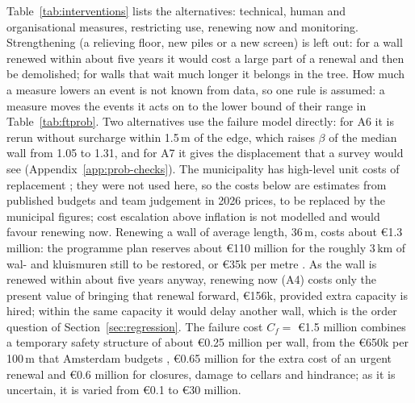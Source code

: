 Table~\ref{tab:interventions} lists the alternatives: technical, human and
organisational measures, restricting use, renewing now and monitoring.
Strengthening (a relieving floor, new piles or a new screen) is left out: for a
wall renewed within about five years it would cost a large part of a renewal and
then be demolished; for walls that wait much longer it belongs in the tree.
How much a measure lowers an event is not known
from data, so one rule is assumed: a measure moves the events it acts on to the
lower bound of their range in Table~\ref{tab:ftprob}. Two alternatives use the
failure model directly: for A6 it is rerun without surcharge within 1.5\,m of
the edge, which raises $\beta$ of the median wall from 1.05 to 1.31, and for A7
it gives the displacement that a survey would see
(Appendix~\ref{app:prob-checks}). The municipality has high-level unit costs
of replacement \parencite{utrecht_qa2026}; they were not used here, so the
costs below are estimates from published budgets and team judgement in 2026
prices, to be replaced by the municipal figures; cost escalation above
inflation is not modelled and would favour renewing now. Renewing a wall of average length, 36\,m, costs about \euro1.3 million: the programme plan reserves about \euro110 million for the roughly 3\,km of wal- and kluismuren still to be restored, or
\euro35k per metre \parencite{utrecht_programmaplan}. As the wall is renewed
within about five years anyway, renewing now (A4) costs only the present value of bringing that renewal forward, \euro156k, provided extra capacity is
hired; within the same capacity it would delay another wall, which is the order
question of Section~\ref{sec:regression}. The failure cost $C_f = $ \euro1.5
million combines a temporary safety structure of about \euro0.25 million per
wall, from the \euro650k per 100\,m that Amsterdam budgets
\parencite{amsterdam_tender}, \euro0.65 million for the extra cost of an urgent
renewal and \euro0.6 million for closures, damage to cellars and hindrance; as
it is uncertain, it is varied from \euro0.1 to \euro30 million.

